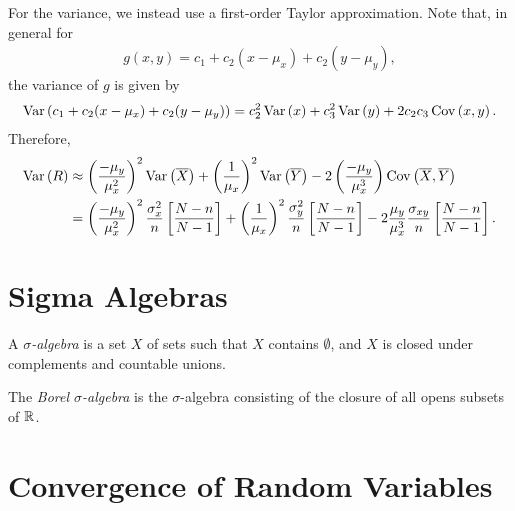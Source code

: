 \begin{exmp}
    For the variance, we instead use a first-order Taylor approximation. Note that, in general for
    \begin{align*}
        g(x,y) = c_1 + c_2(x - \mu_x) + c_2(y - \mu_y),
    \end{align*}
    the variance of $g$ is given by
    \begin{align*}
        \operatorname{Var}\left(c_1 + c_2(x - \mu_x) + c_2(y - \mu_y)\right) = c_2^2\operatorname{Var}\left(x\right) + c_3^2\operatorname{Var}\left(y\right)  + 2c_2c_3\operatorname{Cov}\left(x, y\right).
    \end{align*}
    Therefore,
    \begin{align*}
        \operatorname{Var}\left(R\right) &\approx \left(\frac{-\mu_y}{\mu_x^2}\right)^2\operatorname{Var}\left(\overline{X}\right) + \left(\frac{1}{\mu_x}\right)^2\operatorname{Var}\left(\overline{Y}\right) - 2\left(\frac{-\mu_y}{\mu_x^3}\right)\operatorname{Cov}\left(\overline{X}, \overline{Y}\right) \\
        &= \left(\frac{-\mu_y}{\mu_x^2}\right)^2\frac{\sigma_{x}^2}{n}\left[\frac{N-n}{N-1}\right] + \left(\frac{1}{\mu_x}\right)^2\frac{\sigma_{y}^2}{n}\left[\frac{N-n}{N-1}\right] - 2\frac{\mu_y}{\mu_x^3}\frac{\sigma_{xy}}{n}\left[\frac{N-n}{N-1}\right].
    \end{align*}
\end{exmp}

\section{Sigma Algebras}

\begin{defn}
    A \emph{$\sigma$-algebra} is a set $X$ of sets such that $X$ contains $\emptyset$, and $X$ is closed under complements and countable unions.
\end{defn}

\begin{defn}
    The \emph{Borel $\sigma$-algebra} is the $\sigma$-algebra consisting of the closure of all opens subsets of $\mathbb{R}$.
\end{defn}

\section{Convergence of Random Variables}

